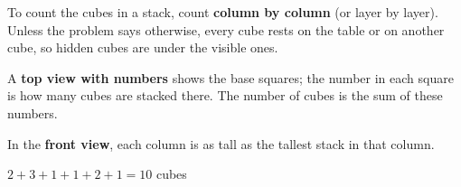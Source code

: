 \begin{knowbox}
\begin{minipage}[t]{0.6\linewidth}
To count the cubes in a stack, count \textbf{column by column} (or layer by layer). Unless the problem says otherwise, every cube rests on the table or on another cube, so hidden cubes are under the visible ones.\par
\smallskip
A \textbf{top view with numbers} shows the base squares; the number in each square is how many cubes are stacked there. The number of cubes is the sum of these numbers.\par
\smallskip
In the \textbf{front view}, each column is as tall as the tallest stack in that column.
\end{minipage}\hfill
\begin{minipage}[t]{0.36\linewidth}\vspace{2pt}\centering
{}\par\smallskip
$2+3+1+1+2+1=10$ cubes
\end{minipage}
\end{knowbox}
\gap
